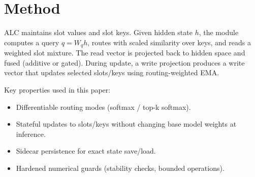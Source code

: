 \section{Method}
ALC maintains slot values and slot keys. Given hidden state $h$, the module computes a query $q=W_q h$, routes with scaled similarity over keys, and reads a weighted slot mixture. The read vector is projected back to hidden space and fused (additive or gated). During update, a write projection produces a write vector that updates selected slots/keys using routing-weighted EMA.

Key properties used in this paper:
\begin{itemize}
  \item Differentiable routing modes (softmax / top-k softmax).
  \item Stateful updates to slots/keys without changing base model weights at inference.
  \item Sidecar persistence for exact state save/load.
  \item Hardened numerical guards (stability checks, bounded operations).
\end{itemize}
